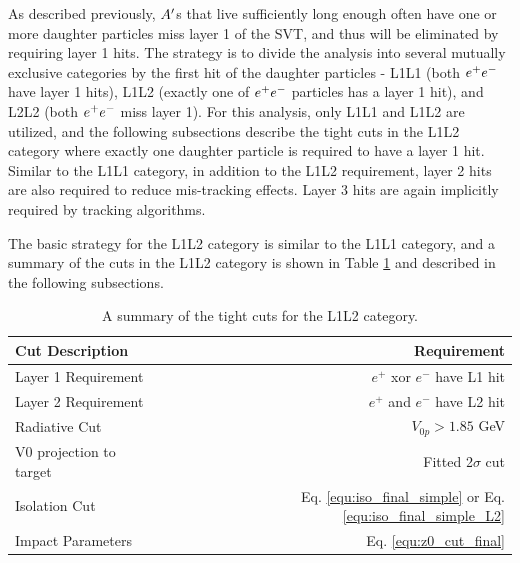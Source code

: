 As described previously, $A^\prime$s that live sufficiently long enough often have one or more daughter particles miss layer 1 of the SVT, and thus will be eliminated by requiring layer 1 hits. The strategy is to divide the analysis into several mutually exclusive categories by the first hit of the daughter particles - L1L1 (both $e^{+}e^{-}$ have layer 1 hits), L1L2 (exactly one of $e^{+}e^{-}$ particles has a layer 1 hit), and L2L2 (both $e^{+}e^{-}$ miss layer 1). For this analysis, only L1L1 and L1L2 are utilized, and the following subsections describe the tight cuts in the L1L2 category where exactly one daughter particle is required to have a layer 1 hit. Similar to the L1L1 category, in addition to the L1L2 requirement, layer 2 hits are also required to reduce mis-tracking effects. Layer 3 hits are again implicitly required by tracking algorithms. %

The basic strategy for the L1L2 category is similar to the L1L1 category, and a summary of the cuts in the L1L2 category is shown in Table \ref{tab:L1L2cuts} and described in the following subsections.

\begin{table}[!hb] 
    \centering
    \begin{tabular}{lr}
        \toprule
        \textbf{Cut Description} & \textbf{Requirement} \\
        \midrule
        Layer 1 Requirement & $e^+$ xor $e^-$ have L1 hit \\
        Layer 2 Requirement & $e^+$ and $e^-$ have L2 hit \\
        Radiative Cut & $V_{0p} > 1.85$ GeV \\
        V0 projection to target & Fitted 2$\sigma$ cut \\
        Isolation Cut & Eq. \ref{equ:iso_final_simple} or Eq. \ref{equ:iso_final_simple_L2} \\ %
        Impact Parameters & Eq. \ref{equ:z0_cut_final} \\
        \bottomrule
    \end{tabular}
    \caption{A summary of the tight cuts for the L1L2 category.}
    \label{tab:L1L2cuts}
\end{table}


